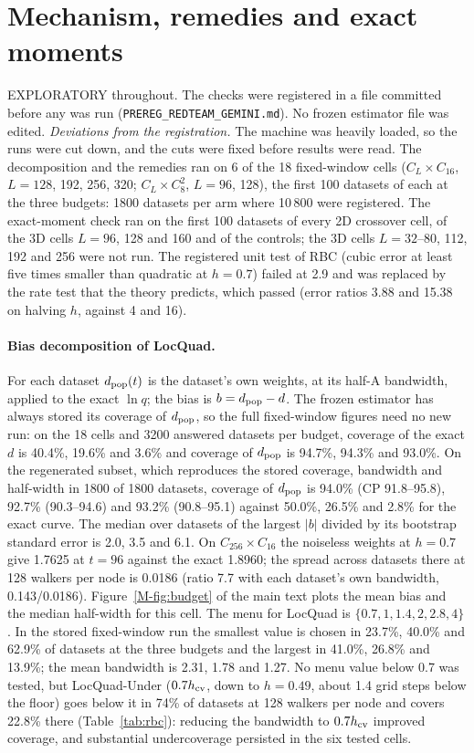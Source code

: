 \documentclass[aps,pre,twocolumn,superscriptaddress,nofootinbib,10pt]{revtex4-2}
\begin{document}
\section{Mechanism, remedies and exact moments}\label{sup:redteam}
EXPLORATORY throughout. The checks were registered in a file committed before any was run (\texttt{PREREG\_REDTEAM\_GEMINI.md}). No frozen estimator file was edited. \emph{Deviations from the registration.} The machine was heavily loaded, so the runs were cut down, and the cuts were fixed before results were read. The decomposition and the remedies ran on 6 of the 18 fixed-window cells ($C_L\times C_{16}$, $L=128$, 192, 256, 320; $C_L\times C_8^2$, $L=96$, 128), the first 100 datasets of each at the three budgets: 1800 datasets per arm where 10\,800 were registered. The exact-moment check ran on the first 100 datasets of every 2D crossover cell, of the 3D cells $L=96$, 128 and 160 and of the controls; the 3D cells $L=32$--80, 112, 192 and 256 were not run. The registered unit test of \textsf{RBC} (cubic error at least five times smaller than quadratic at $h=0.7$) failed at 2.9 and was replaced by the rate test that the theory predicts, which passed (error ratios 3.88 and 15.38 on halving $h$, against 4 and 16).

\paragraph*{Bias decomposition of \textsf{LocQuad}.}
For each dataset $d_{\rm pop}(t)$ is the dataset's own weights, at its half-A bandwidth, applied to the exact $\ln q$; the bias is $b=d_{\rm pop}-d$. The frozen estimator has always stored its coverage of $d_{\rm pop}$, so the full fixed-window figures need no new run: on the 18 cells and 3200 answered datasets per budget, coverage of the exact $d$ is 40.4\%, 19.6\% and 3.6\% and coverage of $d_{\rm pop}$ is 94.7\%, 94.3\% and 93.0\%. On the regenerated subset, which reproduces the stored coverage, bandwidth and half-width in 1800 of 1800 datasets, coverage of $d_{\rm pop}$ is 94.0\% (CP 91.8--95.8), 92.7\% (90.3--94.6) and 93.2\% (90.8--95.1) against 50.0\%, 26.5\% and 2.8\% for the exact curve. The median over datasets of the largest $|b|$ divided by its bootstrap standard error is 2.0, 3.5 and 6.1. On $C_{256}\times C_{16}$ the noiseless weights at $h=0.7$ give 1.7625 at $t=96$ against the exact 1.8960; the spread across datasets there at 128 walkers per node is 0.0186 (ratio 7.7 with each dataset's own bandwidth, 0.143/0.0186). Figure~\ref{M-fig:budget} of the main text plots the mean bias and the median half-width for this cell. The menu for \textsf{LocQuad} is $\{0.7,1,1.4,2,2.8,4\}$. In the stored fixed-window run the smallest value is chosen in 23.7\%, 40.0\% and 62.9\% of datasets at the three budgets and the largest in 41.0\%, 26.8\% and 13.9\%; the mean bandwidth is 2.31, 1.78 and 1.27. No menu value below 0.7 was tested, but \textsf{LocQuad-Under} ($0.7h_{\rm cv}$, down to $h=0.49$, about 1.4 grid steps below the floor) goes below it in 74\% of datasets at 128 walkers per node and covers 22.8\% there (Table~\ref{tab:rbc}): reducing the bandwidth to $0.7h_{\rm cv}$ improved coverage, and substantial undercoverage persisted in the six tested cells.
\end{document}
